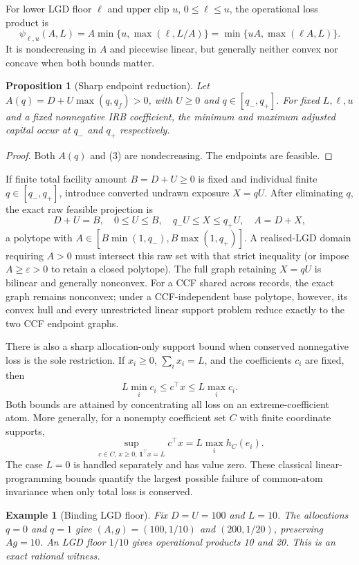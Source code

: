 \documentclass[a4paper,10pt]{article}
\newtheorem{proposition}{Proposition}
\newtheorem{example}{Example}
\begin{document}
For lower LGD floor $\ell$ and upper clip $u$, $0\le\ell\le u$, the operational loss product is
\[
\psi_{\ell,u}(A,L)=A\min\{u,\max(\ell,L/A)\}
=\min\{uA,\max(\ell A,L)\}. \tag{3}
\]
It is nondecreasing in $A$ and piecewise linear, but generally neither convex nor concave when both bounds matter.

\begin{proposition}[Sharp endpoint reduction]
Let $A(q)=D+U\max(q,q_f)>0$, with $U\ge0$ and $q\in[q_-,q_+]$. For fixed $L,\ell,u$ and a fixed nonnegative IRB coefficient, the minimum and maximum adjusted capital occur at $q_-$ and $q_+$ respectively.
\end{proposition}

\begin{proof}
Both $A(q)$ and (3) are nondecreasing. The endpoints are feasible.
\end{proof}

If finite total facility amount $B=D+U\ge0$ is fixed and individual finite $q\in[q_-,q_+]$, introduce converted undrawn exposure $X=qU$. After eliminating $q$, the exact raw feasible projection is
\[
D+U=B,\quad 0\le U\le B,\quad q_-U\le X\le q_+U,\quad A=D+X, \tag{4}
\]
a polytope with $A\in[B\min(1,q_-),B\max(1,q_+)]$. A realised-LGD domain requiring $A>0$ must intersect this raw set with that strict inequality (or impose $A\ge\varepsilon>0$ to retain a closed polytope). The full graph retaining $X=qU$ is bilinear and generally nonconvex. For a CCF shared across records, the exact graph remains nonconvex; under a CCF-independent base polytope, however, its convex hull and every unrestricted linear support problem reduce exactly to the two CCF endpoint graphs.

There is also a sharp allocation-only support bound when conserved nonnegative loss is the sole restriction. If $x_i\ge0$, $\sum_i x_i=L$, and the coefficients $c_i$ are fixed, then
\[
L\min_i c_i\le c^\top x\le L\max_i c_i. \tag{5}
\]
Both bounds are attained by concentrating all loss on an extreme-coefficient atom. More generally, for a nonempty coefficient set $C$ with finite coordinate supports,
\[
\sup_{c\in C,\,x\ge0,\,\mathbf 1^\top x=L}c^\top x
=L\max_i h_C(e_i). \tag{6}
\]
The case $L=0$ is handled separately and has value zero. These classical linear-programming bounds quantify the largest possible failure of common-atom invariance when only total loss is conserved.

\begin{example}[Binding LGD floor]
Fix $D=U=100$ and $L=10$. The allocations $q=0$ and $q=1$ give $(A,g)=(100,1/10)$ and $(200,1/20)$, preserving $Ag=10$. An LGD floor $1/10$ gives operational products 10 and 20. This is an exact rational witness.
\end{example}
\end{document}

